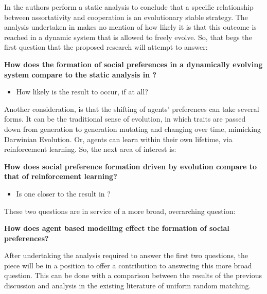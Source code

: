 \documentclass[11pt]{article}
\newcommand*{\np}{\par\noindent\newline}
\begin{document}
In \cite{alger_homo_2013} the authors perform a static analysis to
conclude that a specific relationship between assortativity and cooperation is
an evolutionary stable strategy. The analysis undertaken in \cite{alger_homo_2013} makes no mention of how likely it is that this outcome
is reached in a dynamic system that is allowed to freely evolve. So, that begs
the first question that the proposed research will attempt to answer:
\np\textbf{How does the formation of social preferences in a dynamically evolving system compare to the static analysis in \cite{alger_homo_2013}?}
\begin{itemize}
\item How likely is the \cite{alger_homo_2013} result to occur, if at all? 
\end{itemize}
Another consideration, is that the shifting of agents' preferences can take
several forms. It can be the traditional sense of evolution, in which traits
are passed down from generation to generation mutating and changing over time,
mimicking Darwinian Evolution. Or, agents can learn within their own lifetime,
via reinforcement learning. So, the next area of interest is:
\np\textbf{How does social preference formation driven by evolution compare to that  of reinforcement learning?}
\begin{itemize}
\item Is one closer to the result in \cite{alger_homo_2013}?
\end{itemize}
These two questions are in service of a more broad, overarching question:
\np\textbf{How does agent based modelling effect the formation of social
preferences?}\np After undertaking the analysis required to answer the first two questions, the piece will be in a position to offer a contribution to
answering this more broad question. This can be done with a comparison between
the results of the previous discussion and analysis in the existing literature
of uniform random matching.


\end{document}
